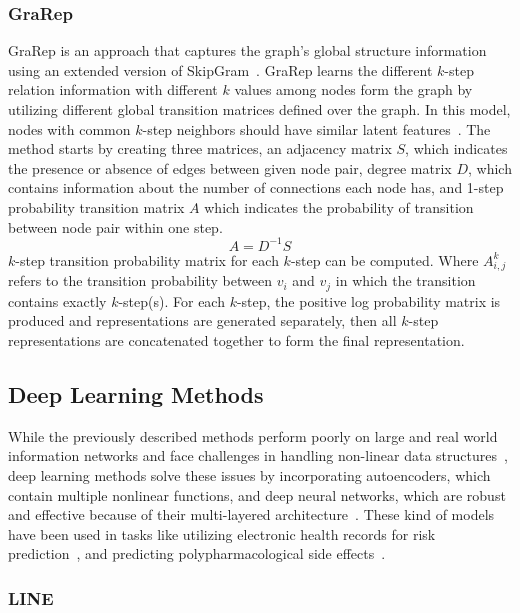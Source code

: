 \subsubsection{GraRep}

\ac{GraRep} is an approach that captures the graph’s global structure information using an extended version of SkipGram~\cite{cao_grarep:_2015}.
\ac{GraRep} learns the different $k$-step relation information with different $k$ values among nodes form the graph by utilizing different global transition matrices defined over the graph.
In this model, nodes with common $k$-step neighbors should have similar latent features~\cite{cao_grarep:_2015}.
The method starts by creating three matrices, an adjacency matrix $S$, which indicates the presence or absence of edges between given node pair, degree matrix $D$, which contains information about the number of connections each node has, and 1-step probability transition matrix $A$ which indicates the probability of transition between node pair within one step.
\begin{equation}
    \label{eq:grarep_01}
    A = D^{-1}S
\end{equation}
$k$-step transition probability matrix for each $k$-step can be computed.
Where $A^{k}_{i,j}$ refers to the transition probability between $v_{i}$ and $v_{j}$ in which the transition contains exactly $k$-step(s).
For each $k$-step, the positive log probability matrix is produced and representations are generated separately, then all $k$-step representations are concatenated together to form the final representation.

\subsection{Deep Learning Methods}

While the previously described methods perform poorly on large and real world information networks and face challenges in handling non-linear data structures~\cite{cui_survey_2017}, deep learning methods solve these issues by incorporating autoencoders, which contain multiple nonlinear functions, and deep neural networks, which are robust and effective because of their multi-layered architecture~\cite{cai_comprehensive_2017}.
These kind of models have been used in tasks like utilizing electronic health records for risk prediction~\cite{cheng_risk_2016}, and predicting polypharmacological side effects~\cite{zitnik_modeling_2018}.

\subsubsection{LINE}

